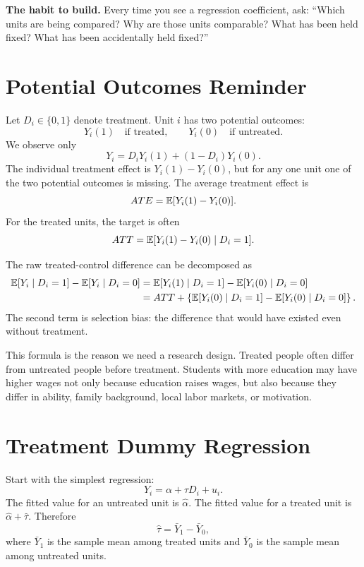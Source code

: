 \begin{boxF}
\textbf{The habit to build.} Every time you see a regression coefficient, ask:
``Which units are being compared? Why are those units comparable? What has
been held fixed? What has been accidentally held fixed?''
\end{boxF}

\section{Potential Outcomes Reminder}

Let $D_i \in \{0,1\}$ denote treatment. Unit $i$ has two potential outcomes:
\[
  Y_i(1) \quad \text{if treated}, \qquad
  Y_i(0) \quad \text{if untreated}.
\]
We observe only
\[
  Y_i = D_iY_i(1) + (1-D_i)Y_i(0).
\]
The individual treatment effect is $Y_i(1)-Y_i(0)$, but for any one unit one
of the two potential outcomes is missing. The average treatment effect is
\[
  ATE = \mathbb{E}[Y_i(1)-Y_i(0)].
\]
For the treated units, the target is often
\[
  ATT = \mathbb{E}[Y_i(1)-Y_i(0)\mid D_i=1].
\]

\begin{defN}
The raw treated-control difference can be decomposed as
\[
\begin{aligned}
  \mathbb{E}[Y_i\mid D_i=1]-\mathbb{E}[Y_i\mid D_i=0]
  &= \mathbb{E}[Y_i(1)\mid D_i=1]-\mathbb{E}[Y_i(0)\mid D_i=0] \\
  &= ATT
  + \left\{\mathbb{E}[Y_i(0)\mid D_i=1]-\mathbb{E}[Y_i(0)\mid D_i=0]\right\}.
\end{aligned}
\]
The second term is selection bias: the difference that would have existed even
without treatment.
\end{defN}

This formula is the reason we need a research design. Treated people often
differ from untreated people before treatment. Students with more education
may have higher wages not only because education raises wages, but also
because they differ in ability, family background, local labor markets, or
motivation.

\section{Treatment Dummy Regression}

Start with the simplest regression:
\[
  Y_i = \alpha + \tau D_i + u_i.
\]
The fitted value for an untreated unit is $\hat\alpha$. The fitted value for a
treated unit is $\hat\alpha+\hat\tau$. Therefore
\[
  \hat\tau
  =
  \bar Y_1-\bar Y_0,
\]
where $\bar Y_1$ is the sample mean among treated units and $\bar Y_0$ is the
sample mean among untreated units.

